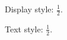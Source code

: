 \documentclass{article}
\begin{document}
Display style: $\displaystyle\frac{1}{2}$.

Text style: $\textstyle\frac{1}{2}$.
\end{document}
